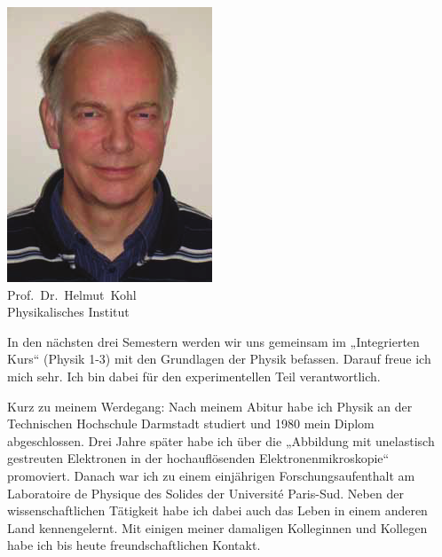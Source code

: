 \begin{multicols}{2}
\begin{center}
	\includegraphics[width=\columnwidth, height=0.35\textheight]{res/vorstellungsfotos/kohl.png}\\
\smallskip
	Prof.\ Dr.\ Helmut\ Kohl\\
	Physikalisches Institut
\end{center}

In den nächsten drei Semestern werden wir uns gemeinsam im „Integrierten Kurs“ (Physik 1-3) mit den Grundlagen der Physik befassen. Darauf freue ich mich sehr. Ich bin dabei für den experimentellen Teil verantwortlich.

Kurz zu meinem Werdegang: Nach meinem Abitur habe ich Physik an der Technischen Hochschule Darmstadt studiert und 1980 mein Diplom abgeschlossen. Drei Jahre später habe ich über die „Abbildung mit unelastisch gestreuten Elektronen in der hochauflösenden Elektronenmikroskopie“ promoviert. Danach war ich zu einem einjährigen Forschungsaufenthalt am Laboratoire de Physique des Solides der Université Paris-Sud. Neben der wissenschaftlichen Tätigkeit habe ich dabei auch das Leben in einem anderen Land kennengelernt. Mit einigen meiner damaligen Kolleginnen und Kollegen habe ich bis heute freundschaftlichen Kontakt.


\end{multicols}
